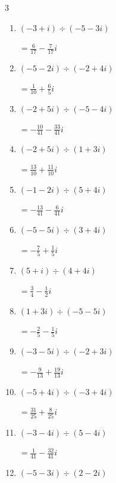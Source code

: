 \begin{multicols}{3}
\begin{enumerate}
        $\displaystyle =-1$

  \item $\displaystyle (-3+i)\div(-5-3i)$

        $\displaystyle =\frac{6}{17}-\frac{7}{17}i$

  \item $\displaystyle (-5-2i)\div(-2+4i)$

        $\displaystyle =\frac{1}{10}+\frac{6}{5}i$

  \item $\displaystyle (-2+5i)\div(-5-4i)$

        $\displaystyle =-\frac{10}{41}-\frac{33}{41}i$

\columnbreak %

  \item $\displaystyle (-2+5i)\div(1+3i)$

        $\displaystyle =\frac{13}{10}+\frac{11}{10}i$

  \item $\displaystyle (-1-2i)\div(5+4i)$

        $\displaystyle =-\frac{13}{41}-\frac{6}{41}i$

  \item $\displaystyle (-5-5i)\div(3+4i)$

        $\displaystyle =-\frac{7}{5}+\frac{1}{5}i$

  \item $\displaystyle (5+i)\div(4+4i)$

        $\displaystyle =\frac{3}{4}-\frac{1}{2}i$

  \item $\displaystyle (1+3i)\div(-5-5i)$

        $\displaystyle =-\frac{2}{5}-\frac{1}{5}i$

  \item $\displaystyle (-3-5i)\div(-2+3i)$

        $\displaystyle =-\frac{9}{13}+\frac{19}{13}i$

  \item $\displaystyle (-5+4i)\div(-3+4i)$

        $\displaystyle =\frac{31}{25}+\frac{8}{25}i$

  \item $\displaystyle (-3-4i)\div(5-4i)$

        $\displaystyle =\frac{1}{41}-\frac{32}{41}i$

  \item $\displaystyle (-5-3i)\div(2-2i)$


\end{enumerate}
\end{multicols}
